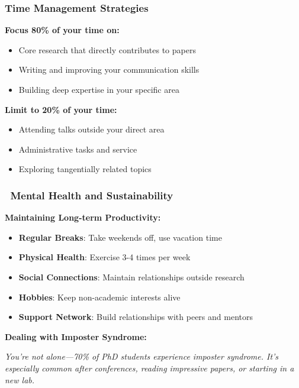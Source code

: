 \documentclass[11pt,a4paper]{article}
\begin{document}
\subsubsection{Time Management Strategies}

\begin{tcolorbox}[colback=green!10,colframe=green!50,title=The 80/20 Rule for PhD Productivity]
\textbf{Focus 80\% of your time on:}
\begin{itemize}
    \item Core research that directly contributes to papers
    \item Writing and improving your communication skills
    \item Building deep expertise in your specific area
\end{itemize}

\textbf{Limit to 20\% of your time:}
\begin{itemize}
    \item Attending talks outside your direct area
    \item Administrative tasks and service
    \item Exploring tangentially related topics
\end{itemize}
\end{tcolorbox}

\subsubsection{\faHeart~Mental Health and Sustainability}

\textbf{Maintaining Long-term Productivity:}
\begin{itemize}
    \item \textbf{Regular Breaks}: Take weekends off, use vacation time
    \item \textbf{Physical Health}: Exercise 3-4 times per week
    \item \textbf{Social Connections}: Maintain relationships outside research
    \item \textbf{Hobbies}: Keep non-academic interests alive
    \item \textbf{Support Network}: Build relationships with peers and mentors
\end{itemize}

\textbf{Dealing with Imposter Syndrome:}

\textit{You're not alone—70\% of PhD students experience imposter syndrome. It's especially common after conferences, reading impressive papers, or starting in a new lab.}
\end{document}

